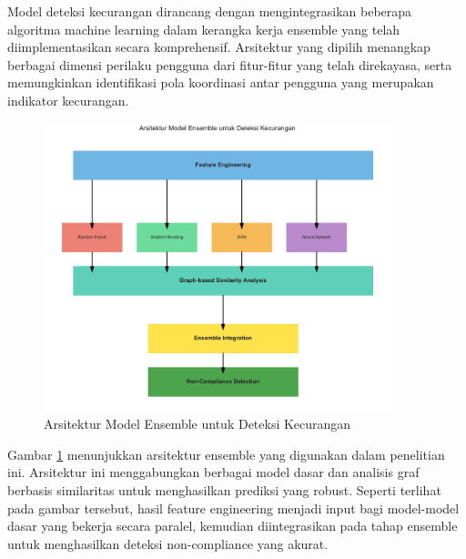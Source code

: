 Model deteksi kecurangan dirancang dengan mengintegrasikan beberapa algoritma machine learning dalam kerangka kerja ensemble yang telah diimplementasikan secara komprehensif. Arsitektur yang dipilih menangkap berbagai dimensi perilaku pengguna dari fitur-fitur yang telah direkayasa, serta memungkinkan identifikasi pola koordinasi antar pengguna yang merupakan indikator kecurangan.

\begin{figure}[htbp]
    \centering
    \includegraphics[width=0.9\textwidth]{figures/ensemble_architecture.pdf}
    \caption{Arsitektur Model Ensemble untuk Deteksi Kecurangan}
    \label{fig:ensemble_architecture}
\end{figure}

Gambar \ref{fig:ensemble_architecture} menunjukkan arsitektur ensemble yang digunakan dalam penelitian ini. Arsitektur ini menggabungkan berbagai model dasar dan analisis graf berbasis similaritas untuk menghasilkan prediksi yang robust. Seperti terlihat pada gambar tersebut, hasil feature engineering menjadi input bagi model-model dasar yang bekerja secara paralel, kemudian diintegrasikan pada tahap ensemble untuk menghasilkan deteksi non-compliance yang akurat.


